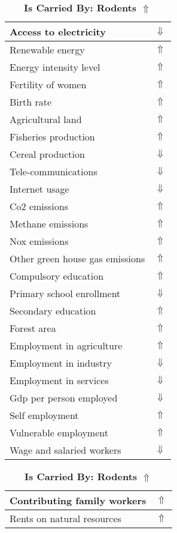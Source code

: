 \documentclass[12pt,notitlepage,oneside]{report}
\begin{document}
\begin{table}[!htb]
\caption{\textbf{Is Carried By: Rodents $\Uparrow$}}
\centering
\label{Correlated Socio-economic Factors0}
\begin{tabular}{|l|l|}
\hline
Access to electricity & $\Downarrow$\\ \hline
Renewable energy & $\Uparrow$\\ \hline
Energy intensity level & $\Uparrow$\\ \hline
Fertility of women & $\Uparrow$\\ \hline
Birth rate & $\Uparrow$\\ \hline
Agricultural land & $\Uparrow$\\ \hline
Fisheries production & $\Uparrow$\\ \hline
Cereal production & $\Downarrow$\\ \hline
Tele-communications & $\Downarrow$\\ \hline
Internet usage & $\Downarrow$\\ \hline
Co2 emissions & $\Uparrow$\\ \hline
Methane emissions & $\Uparrow$\\ \hline
Nox emissions & $\Uparrow$\\ \hline
Other green house gas emissions & $\Uparrow$\\ \hline
Compulsory education & $\Uparrow$\\ \hline
Primary school enrollment & $\Downarrow$\\ \hline
Secondary education & $\Uparrow$\\ \hline
Forest area & $\Uparrow$\\ \hline
Employment in agriculture & $\Uparrow$\\ \hline
Employment in industry & $\Downarrow$\\ \hline
Employment in services & $\Downarrow$\\ \hline
Gdp per person employed & $\Downarrow$\\ \hline
Self employment & $\Uparrow$\\ \hline
Vulnerable employment & $\Uparrow$\\ \hline
Wage and salaried workers & $\Downarrow$\\ \hline
\end{tabular}
\begin{tabular}{|l|l|}
\hline
Contributing family workers & $\Uparrow$\\ \hline
Rents on natural resources & $\Uparrow$\\ \hline

\end{tabular}
\end{table}
\end{document}
